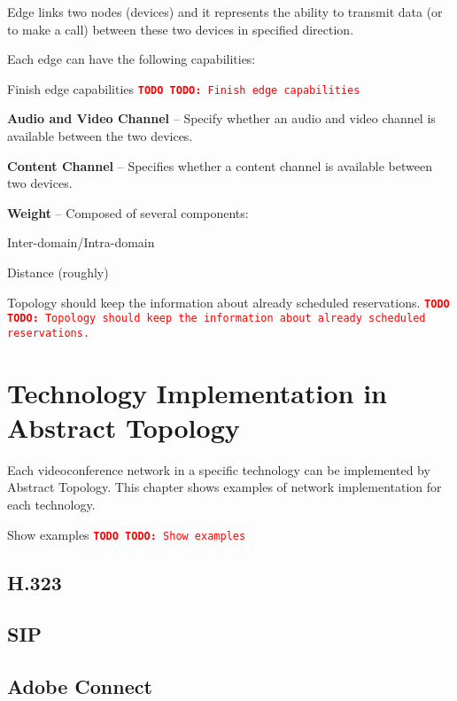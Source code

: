 \documentclass[a4paper]{report}
\newcommand{\TODO}[1]{%
\def\empty{}%
\def\prvniparametr{#1}%
\ifx\prvniparametr\empty%
\begingroup\tt\textcolor{red}{\noindent\textbf{TODO}}\endgroup
\else%
\begingroup\tt\textcolor{red}{\noindent\textbf{TODO:}\ #1}\endgroup
\fi%
}
\begin{document}
Edge links two nodes (devices) and it represents the 
ability to transmit data (or to make a call) between these two devices 
in specified direction.
  
Each edge can have the following capabilities:

\TODO{Finish edge capabilities}

\begin{compactitem}   
  \item \textbf{Audio and Video Channel} -- Specify whether an audio and video channel is available between the two devices.
      
  \item \textbf{Content Channel} -- Specifies whether a content channel is available between two devices.
    
  \item \textbf{Weight} -- Composed of several components:
  \begin{compactitem}  
    \item Inter-domain/Intra-domain
    \item Distance (roughly)
  \end{compactitem}
    
\end{compactitem}   

\TODO{Topology should keep the information about already scheduled reservations.}
  

\chapter{Technology Implementation in Abstract Topology}
Each videoconference network in a specific technology can be implemented by Abstract Topology. This chapter shows examples of network implementation for each technology.

\TODO{Show examples}

\section{H.323}

\section{SIP}

\section{Adobe Connect}
\end{document}

